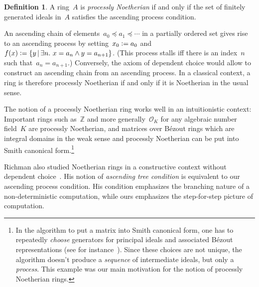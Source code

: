 \documentclass[10pt,reqno,a4paper]{amsbook}
\theoremstyle{definition}
\newtheorem{defn}{Definition}[section]
\theoremstyle{plain}
\theoremstyle{remark}
\newcommand{\ZZ}{\mathbb{Z}}
\renewcommand{\O}{\mathcal{O}}
\newcommand{\?}{\,{:}\,}
\renewcommand{\_}{\mathpunct{.}\,}
\newcommand{\defeq}{\vcentcolon=}
\begin{document}
{\begin{defn}A ring~$A$ is \emph{processly Noetherian} if and only if the
set of finitely generated ideals in~$A$ satisfies the ascending process
condition.\end{defn}

An ascending chain of elements~$a_0 \preceq a_1 \preceq \cdots$ in a partially
ordered set gives rise to an ascending process by setting~$x_0 \defeq a_0$
and~$f(x) \defeq \{ y \,|\, \exists n\_ x = a_n \wedge y = a_{n+1} \}$.
(This process stalls iff there is an index~$n$ such that~$a_n = a_{n+1}$.)
Conversely, the axiom of dependent choice would allow to construct an
ascending chain from an ascending process. In
a classical context, a ring is therefore
processly Noetherian if and only if it is Noetherian in the usual sense.

The notion of a processly Noetherian ring works well in an
intuitionistic context: Important rings such as~$\ZZ$ and more generally~$\O_K$
for any algebraic number field~$K$ are processly Noetherian, and matrices
over Bézout rings which are integral domains in the weak sense and
processly Noetherian can be put into Smith canonical form.\footnote{In the
algorithm to put a matrix into Smith canonical form, one has to repeatedly
\emph{choose} generators for principal ideals and associated Bézout
representations (see for instance~\cite[Section~4]{richman:noetherian}). Since
these choices are not unique, the algorithm doesn't produce a \emph{sequence}
of intermediate ideals, but only a \emph{process}. This example was our main
motivation for the notion of processly Noetherian rings.}

Richman also studied Noetherian rings in a constructive context without
dependent choice~\cite{richman:noetherian}. His notion of \emph{ascending tree
condition} is equivalent to our ascending process condition. His condition
emphasizes the branching nature of a non-deterministic computation, while ours
emphasizes the step-for-step picture of computation.

}
\end{document}
